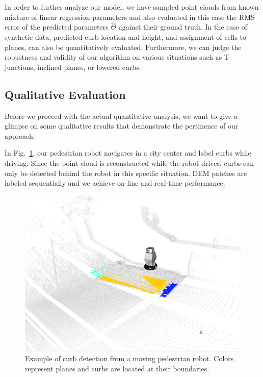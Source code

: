 In order to further analyze our model, we have sampled point clouds from known
mixture of linear regression parameters and also evaluated in this case the RMS
error of the predicted parameters $\hat{\Theta}$ against their ground truth. In
the case of synthetic data, predicted curb location and height, and assignment
of cells to planes, can also be quantitatively evaluated. Furthermore, we can
judge the robustness and validity of our algorithm on various situations such
as T-junctions, inclined planes, or lowered curbs.

\subsection{Qualitative Evaluation}
Before we proceed with the actual quantitative analysis, we want to give a
glimpse on some qualitative results that demonstrate the pertinence of our
approach.

In Fig.~\ref{fig:europa}, our pedestrian robot navigates in a city center and
label curbs while driving. Since the point cloud is reconstructed while the
robot drives, curbs can only be detected behind the robot in this specific
situation. DEM patches are labeled sequentially and we achieve on-line and
real-time performance.

\begin{figure}[t]
\centering
\includegraphics[width=\columnwidth]{fig/europa.eps}
\caption{Example of curb detection from a moving pedestrian robot. Colors
represent planes and curbs are located at their boundaries.}
\label{fig:europa}
\end{figure}

